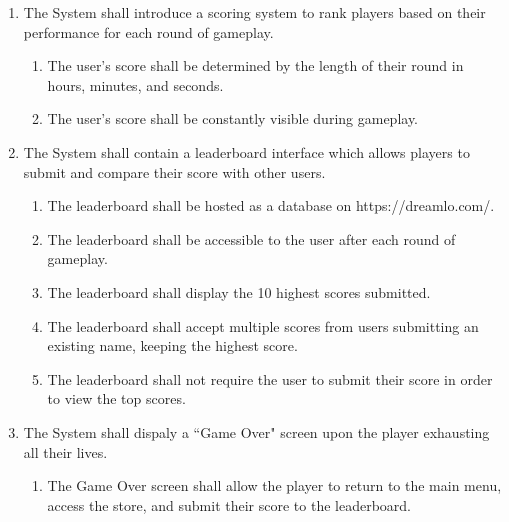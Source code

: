 \documentclass[12pt]{report}
\newenvironment{reqlist}{
	\renewcommand{\labelenumi}{\tab\thesubsection.\arabic{enumi}}
	\renewcommand{\labelenumii}{\thesubsection.\arabic{enumi}.\arabic{enumii}}
	\begin{enumerate}[itemsep = 1pt, parsep = 0pt, leftmargin = *]
}{\end{enumerate}}
\begin{document}
\begin{reqlist}
			\begin{reqlist}
				\item The store shall be accessible to the user after each round of gameplay.
				\item The store shall allow the user to make purchases by clicking a UI button.
				\item The store shall display the name, price, and description for each available item upon hovering over their purchase buttons.
				\item The store shall not allow the user to purchase an item already in their posession.
				\item The store purchases shall be persistent between multiple sessions.
				\item The store purchases shall be erased upon the user pressing the ``delete data" button in the settings menu.
			\end{reqlist}
			\item The System shall introduce a scoring system to rank players based on their performance for each round of gameplay.
			\begin{reqlist}
				\item The user's score shall be determined by the length of their round in hours, minutes, and seconds.
				\item The user's score shall be constantly visible during gameplay.
			\end{reqlist}
			\item The System shall contain a leaderboard interface which allows players to submit and compare their score with other users.
			\begin{reqlist}
				\item The leaderboard shall be hosted as a database on https://dreamlo.com/.
				\item The leaderboard shall be accessible to the user after each round of gameplay.
				\item The leaderboard shall display the 10 highest scores submitted.
				\item The leaderboard shall accept multiple scores from users submitting an existing name, keeping the highest score.
				\item The leaderboard shall not require the user to submit their score in order to view the top scores.
			\end{reqlist}
			\item The System shall dispaly a ``Game Over" screen upon the player exhausting all their lives.
			\begin{reqlist}
				\item The Game Over screen shall allow the player to return to the main menu, access the store, and submit their score to the leaderboard.
			\end{reqlist}
		\end{reqlist}
\end{document}
